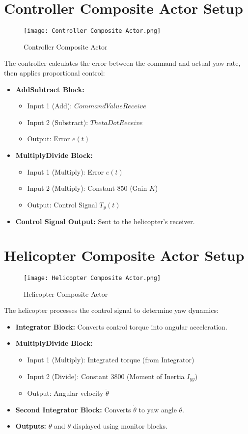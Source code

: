 \documentclass{article}
\begin{document}
\section{Controller Composite Actor Setup}
\begin{figure}
    \centering
    \texttt{[image: Controller Composite Actor.png]}
    \caption{Controller Composite Actor}
    \label{fig:enter-label}
\end{figure}
The controller calculates the error between the command and actual yaw rate, then applies proportional control:
\begin{itemize}
    \item \textbf{AddSubtract Block:}
    \begin{itemize}
        \item Input 1 (Add): $CommandValueReceive$ 
        \item Input 2 (Substract): $ThetaDotReceive$ 
        \item Output: Error $e(t)$
    \end{itemize}
    \item \textbf{MultiplyDivide Block:}
    \begin{itemize}
        \item Input 1 (Multiply): Error $e(t)$
        \item Input 2 (Multiply): Constant 850 (Gain $K$)
        \item Output: Control Signal $T_y(t)$
    \end{itemize}
    \item \textbf{Control Signal Output:} Sent to the helicopter’s receiver.
\end{itemize}

\section{Helicopter Composite Actor Setup}
\begin{figure}
    \centering
    \texttt{[image: Helicopter Composite Actor.png]}
    \caption{Helicopter Composite Actor}
    \label{fig:enter-label}
\end{figure}
The helicopter processes the control signal to determine yaw dynamics:
\begin{itemize}
    \item \textbf{Integrator Block:} Converts control torque into angular acceleration.
    \item \textbf{MultiplyDivide Block:}
    \begin{itemize}
        \item Input 1 (Multiply): Integrated torque (from Integrator)
        \item Input 2 (Divide): Constant 3800 (Moment of Inertia $I_{yy}$)
        \item Output: Angular velocity $\dot{\theta}$
    \end{itemize}
    \item \textbf{Second Integrator Block:} Converts $\dot{\theta}$ to yaw angle $\theta$.
    \item \textbf{Outputs:} $\theta$ and $\dot{\theta}$ displayed using monitor blocks.
\end{itemize}
\end{document}
